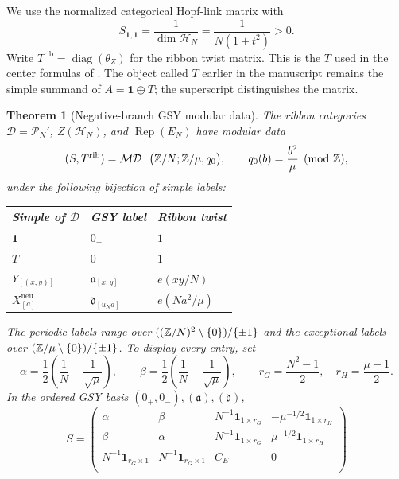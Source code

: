 \documentclass[11pt,a4paper]{article}
\numberwithin{equation}{section}
\newtheorem{theorem}{Theorem}[section]
\theoremstyle{definition}\newtheorem{definition}[theorem]{Definition}
\theoremstyle{remark}\newtheorem{remark}[theorem]{Remark}
\newcommand{\one}{\mathbf1}\newcommand{\B}{\mathcal B}\newcommand{\W}{W_N}
\newcommand{\Rep}{\operatorname{Rep}}\newcommand{\Ext}{\operatorname{Ext}}
\newcommand{\diag}{\operatorname{diag}}\renewcommand{\Vec}{\operatorname{Vec}}
\begin{document}
We use the normalized categorical Hopf-link matrix with
\begin{equation}\label{eq:gsy-normalization}
 S_{\one,\one}=\frac1{\dim\mathcal H_N}
              =\frac1{N(1+t^2)}>0.
\end{equation}
Write $T^{\mathrm{rib}}=\diag(\theta_Z)$ for the ribbon twist matrix.
This is the $T$ used in the center formulas of \cite{gsy}.
The object called $T$ earlier in the manuscript remains the simple
summand of $A=\one\oplus T$; the superscript distinguishes the matrix.

\begin{theorem}[Negative-branch GSY modular data]\label{thm:gsy-modular}
The ribbon categories $\mathcal D=\mathcal P_N'$,
$Z(\mathcal H_N)$, and $\Rep(E_N)$ have modular data
\begin{equation}\label{eq:gsy-identification}
 (S,T^{\mathrm{rib}})
 =\mathcal{MD}_{-}\bigl(\mathbb Z/N;\mathbb Z/\mu,q_0\bigr),
 \qquad q_0(b)=\frac{b^2}{\mu}\pmod{\mathbb Z},
\end{equation}
under the following bijection of simple labels:
\begin{center}
\begin{tabular}{@{}lll@{}}
\toprule
Simple of $\mathcal D$ & GSY label & Ribbon twist\\
\midrule
$\one$ & $0_+$ & $1$\\
$T$ & $0_-$ & $1$\\
$Y_{[(x,y)]}$ & $\mathfrak a_{[x,y]}$ & $e(xy/N)$\\
$X^{\mathrm{neu}}_{[a]}$ & $\mathfrak d_{[u_Na]}$ & $e(Na^2/\mu)$\\
\bottomrule
\end{tabular}
\end{center}
The periodic labels range over
$((\mathbb Z/N)^2\setminus\{0\})/\{\pm1\}$ and the exceptional labels over
$(\mathbb Z/\mu\setminus\{0\})/\{\pm1\}$.
To display every entry, set
\[
 \alpha=\frac12\left(\frac1N+\frac1{\sqrt\mu}\right),
 \qquad
 \beta=\frac12\left(\frac1N-\frac1{\sqrt\mu}\right),
 \qquad r_G=\frac{N^2-1}{2},\quad r_H=\frac{\mu-1}{2}.
\]
In the ordered GSY basis $(0_+,0_-),(\mathfrak a),(\mathfrak d)$,
\begin{equation}\label{eq:gsy-full-S}
 S=\begin{pmatrix}
 \alpha&\beta&N^{-1}\mathbf1_{1\times r_G}&-\mu^{-1/2}\mathbf1_{1\times r_H}\\
 \beta&\alpha&N^{-1}\mathbf1_{1\times r_G}&\mu^{-1/2}\mathbf1_{1\times r_H}\\
 N^{-1}\mathbf1_{r_G\times1}&N^{-1}\mathbf1_{r_G\times1}&C_E&0\\

\end{pmatrix}
\end{equation}
\end{theorem}
\end{document}
